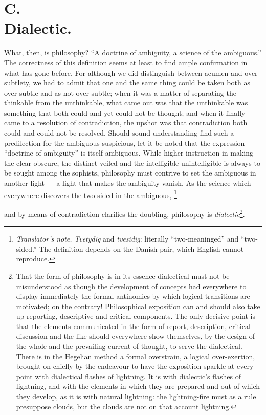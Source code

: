 \documentclass[12pt,a4paper]{book}
\renewcommand{\thefootnote}{\ifcase\value{footnote}\or *)\or **)\or ***)\fi}
\newcommand{\tnote}[1]{%
  \begingroup
  \renewcommand{\thefootnote}{\textdagger}%
  \footnote{\emph{Translator's note.} #1}%
  \addtocounter{footnote}{-1}%
  \endgroup}
\begin{document}
\section*{C.\\ Dialectic.}


What, then, is philosophy? ``A doctrine of ambiguity, a science of the
ambiguous.'' The correctness of this definition seems at least to find ample
confirmation in what has gone before. For although we did distinguish between
acumen and over-subtlety, we had to admit that one and the same thing could be
taken both as over-subtle and as not over-subtle; when it was a matter of
separating the thinkable from the unthinkable, what came out was that the
unthinkable was something that both could and yet could not be thought; and
when it finally came to a resolution of contradiction, the upshot was that
contradiction both could and could not be resolved. Should sound understanding
find such a predilection for the ambiguous suspicious, let it be noted that the
expression ``doctrine of ambiguity'' is itself ambiguous. While higher
instruction in making the clear obscure, the distinct veiled and the
intelligible unintelligible is always to be sought among the sophists,
philosophy must contrive to set the ambiguous in another light --- a light that
makes the ambiguity vanish. As the science which everywhere discovers the
two-sided in the ambiguous,\tnote{\emph{Tvetydig} and \emph{tvesidig}:
literally ``two-meaninged'' and ``two-sided.'' The definition depends on the
Danish pair, which English cannot reproduce.} and by means of contradiction
clarifies the doubling, philosophy is \emph{dialectic}\footnote{That the form
of philosophy is in its essence dialectical must not be misunderstood as though
the development of concepts had everywhere to display immediately the formal
antinomies by which logical transitions are motivated; on the contrary!
Philosophical exposition can and should also take up reporting, descriptive and
critical components. The only decisive point is that the elements communicated
in the form of report, description, critical discussion and the like should
everywhere show themselves, by the design of the whole and the prevailing
current of thought, to serve the dialectical. There is in the Hegelian method a
formal overstrain, a logical over-exertion, brought on chiefly by the endeavour
to have the exposition sparkle at every point with
dialectical flashes of lightning. It is with dialectic's flashes of lightning,
and with the elements in which they are prepared and out of which they develop,
as it is with natural lightning: the lightning-fire must as a rule presuppose
clouds, but the clouds are not on that account lightning.}.
\end{document}
